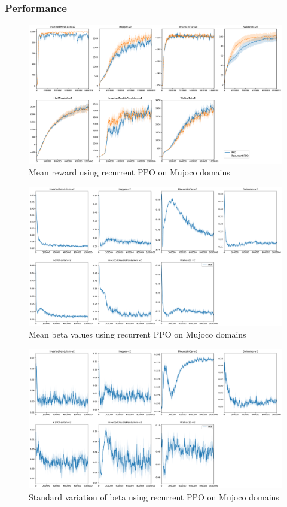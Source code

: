 \subsubsection{Performance}
\begin{figure}
    \centering
    \includegraphics[scale=0.34]{fig/full_mujoco.pdf}
    \caption{Mean reward using recurrent PPO on Mujoco domains}
    \label{fig:full_mujoco}
\end{figure}
\begin{figure}
    \centering
    \includegraphics[scale=0.34]{fig/beta_mean.pdf}
    \caption{Mean beta values using recurrent PPO on Mujoco domains}
    \label{fig:beta_mean}
\end{figure}\begin{figure}
    \centering
    \includegraphics[scale=0.34]{fig/beta_std.pdf}
    \caption{Standard variation of beta using recurrent PPO on Mujoco domains}
    \label{fig:beta_std}
\end{figure}
